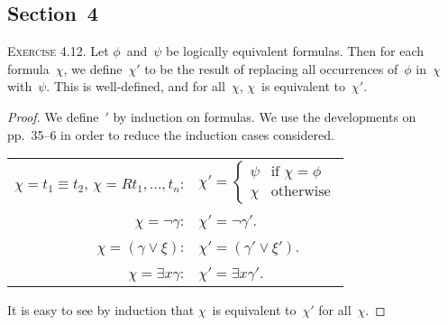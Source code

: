 \documentclass[letterpaper]{article}
\theoremstyle{remark}
\begin{document}
\subsection*{Section~4}
\noindent\textsc{Exercise 4.12.} Let $\phi$~and~$\psi$ be logically equivalent formulas. Then for each formula~$\chi$, we define~$\chi'$ to be the result of replacing all occurrences of~$\phi$ in~$\chi$ with~$\psi$. This is well-defined, and for all~$\chi$, $\chi$~is equivalent to~$\chi'$.
\begin{proof}
We define~$'$ by induction on formulas. We use the developments on pp.~35--6 in order to reduce the induction cases considered.
\begin{center}
\begin{tabular}{rl}
$\chi=t_1\equiv t_2$, $\chi=Rt_1,\ldots,t_n$:&$\chi'=\begin{cases}\psi&\text{if $\chi=\phi$}\\\chi&\text{otherwise}\end{cases}$\\
$\chi=\lnot\gamma$:&$\chi'=\lnot\gamma'$.\\
$\chi=(\gamma\lor\xi)$:&$\chi'=(\gamma'\lor\xi')$.\\
$\chi=\exists x\gamma$:&$\chi'=\exists x\gamma'$.
\end{tabular}
\end{center}
It is easy to see by induction that $\chi$~is equivalent to~$\chi'$ for all~$\chi$.
\end{proof}
\end{document}
